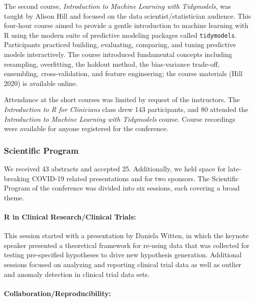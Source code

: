 The second course, \emph{Introduction to Machine Learning with Tidymodels}, was taught by Alison Hill and focused on the data scientist/statistician audience. This four-hour course aimed to provide a gentle introduction to machine learning with R using the modern suite of predictive modeling packages called \texttt{tidymodels}. Participants practiced building, evaluating, comparing, and tuning predictive models interactively. The course introduced fundamental concepts including resampling, overfitting, the holdout method, the bias-variance trade-off, ensembling, cross-validation, and feature engineering; the course materials (Hill 2020) is available online.

Attendance at the short courses was limited by request of the instructors.
The \emph{Introduction to R for Clinicians} class drew 143 participants, and 80
attended the \emph{Introduction to Machine Learning with Tidymodels} course. Course recordings were available for anyone registered for the conference.

\hypertarget{scientific-program}{%
\subsubsection{Scientific Program}\label{scientific-program}}

We received 43 abstracts and accepted 25. Additionally, we held space for late-breaking COVID-19 related presentations and for two sponsors. The Scientific Program of the conference was divided into six sessions, each covering a broad theme.

\hypertarget{r-in-clinical-researchclinical-trials}{%
\paragraph{R in Clinical Research/Clinical Trials:}\label{r-in-clinical-researchclinical-trials}}

This session started with a presentation by Daniela Witten, in which the keynote speaker presented a theoretical framework for re-using data that was collected for testing pre-specified hypotheses to drive new hypothesis generation. Additional sessions focused on analyzing and reporting clinical trial data as well as outlier and anomaly detection in clinical trial data sets.

\hypertarget{collaborationreproducibility}{%
\paragraph{Collaboration/Reproducibility:}\label{collaborationreproducibility}}

